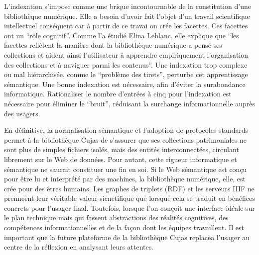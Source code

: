 L'indexation s'impose comme une brique incontournable de la constitution d'une bibliothèque numérique. Elle a besoin d'avoir fait l'objet d'un travail scientifique intellectuel conséquent car à partir de ce travai on crée les facettes. Ces facettes ont un \enquote{rôle cognitif}. Comme l'a étudié Elina Leblanc, elle explique que \enquote{les facettes reflètent la manière dont la bibliothèque numérique a pensé ses collections et aident ainsi l'utilisateur à apprendre empiriquement l'organisation des collections et à naviguer parmi les contenus}. Une indexation trop complexe ou mal hiérarchisée, comme le \enquote{problème des tirets}, perturbe cet apprentissage sémantique. Une bonne indexation est nécessaire, afin d'éviter la surabondance informatique. Rationaliser le nombre d'entrées à cinq pour l'indexation est nécessaire pour éliminer le \enquote{bruit}, réduisant la surchange informationnelle auprès des usagers.
\bigskip

En définitive, la normalisation sémantique et l'adoption de protocoles standards permet à la bibliothèque Cujas de s'assurer que ses collections patrimoniales ne sont plus de simples fichiers isolés, mais des entités interconnectées, circulant librement sur le Web de données. Pour autant, cette rigueur informatique et sémantique ne saurait constituer une fin en soi. Si le Web sémantique est conçu pour être lu et interprété par des machines, la bibliothèque numérique, elle, est crée pour des êtres humains. Les graphes de triplets (RDF) et les serveurs IIIF ne prenneent leur véritable valeur sicnetifique que lorsque cela se traduit en bénéfices concrets pour l'usager final. Toutefois, lorsque l'on conçoit une interface idéale sur le plan technique mais qui fassent abstractions des réalités cognitives, des compétences informationnelles et de la façon dont les équipes travaillent. Il est important que la future plateforme de la bibliothèque Cujas replacea l'usager au centre de la réflexion en analysant leurs attentes.
